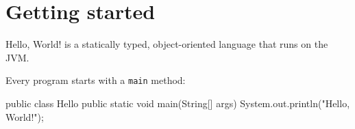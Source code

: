 \section{Getting started}

\begin{frame}{Hello, World!}
   is a statically typed, object-oriented language that runs on the JVM.

  \medskip
  Every program starts with a \texttt{main} method:

  \smallskip
  \begin{semiverbatim}
public class Hello {
  public static void main(String[] args) {
    System.out.println("Hello, World!");
  }
}
  \end{semiverbatim}
\end{frame}
